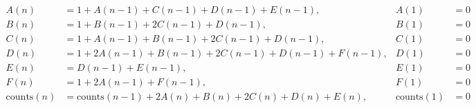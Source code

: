 \documentclass{article}
\begin{document}
\scriptsize
\begin{align*}
A(n) &= 1 + A(n-1) + C(n-1) + D(n-1) + E(n-1), &A(1) &= 0 \\
B(n) &= 1 + B(n-1) + 2C(n-1) + D(n-1), &B(1) &= 0 \\
C(n) &= 1 + A(n-1) + B(n-1) + 2C(n-1) + D(n-1), &C(1) &= 0 \\
D(n) &= 1 + 2A(n-1) + B(n-1) + 2C(n-1) + D(n-1) + F(n-1), &D(1) &= 0 \\
E(n) &= D(n-1) + E(n-1), &E(1) &= 0 \\
F(n) &= 1 + 2A(n-1) + F(n-1), &F(1) &= 0 \\
\text{counts}(n) &= \text{counts}(n-1) + 2A(n) + B(n) + 2C(n) + D(n) + E(n), &\text{counts}(1) &= 0
\end{align*}
\end{document}

